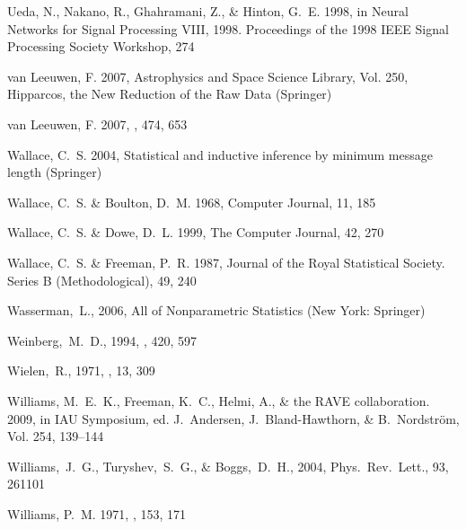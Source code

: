 \begin{thebibliography}{99}
{Ueda}, N., {Nakano}, R., {Ghahramani}, Z., \& {Hinton}, G.~E. 1998, in {Neural
  Networks for Signal Processing VIII, 1998. Proceedings of the 1998 IEEE
  Signal Processing Society Workshop}, 274

{van Leeuwen}, F. 2007{}, Astrophysics and Space Science Library,
  Vol. 250, {Hipparcos, the New Reduction of the Raw Data} ({Springer})

{van Leeuwen}, F. 2007{}, \aap, 474, 653

{Wallace}, C.~S. 2004, {Statistical and inductive inference by minimum message
  length} ({Springer})

{Wallace}, C.~S. \& {Boulton}, D.~M. 1968, {Computer Journal}, 11, 185

{Wallace}, C.~S. \& {Dowe}, D.~L. 1999, {The Computer Journal}, 42, 270

{Wallace}, C.~S. \& {Freeman}, P.~R. 1987, Journal of the Royal Statistical
  Society. Series B (Methodological), 49, 240

  Wasserman,~L., 2006,
  All of Nonparametric Statistics (New York: Springer)

  Weinberg,~M.~D., 1994,
  \apj, 420, 597

  Wielen,~R., 1971, \aap, 13, 309

{Williams}, M.~E.~K., {Freeman}, K.~C., {Helmi}, A., \& {the RAVE
  collaboration}. 2009, in IAU Symposium, ed. J.~{Andersen},
  J.~{Bland-Hawthorn}, \& B.~{Nordstr{\"o}m}, Vol. 254, 139--144

  Williams,~J.~G., Turyshev,~S.~G., \& Boggs,~D.~H., 2004,
  Phys.~Rev.~Lett., 93, 261101

{Williams}, P.~M. 1971, \mnras, 153, 171


\end{thebibliography}
